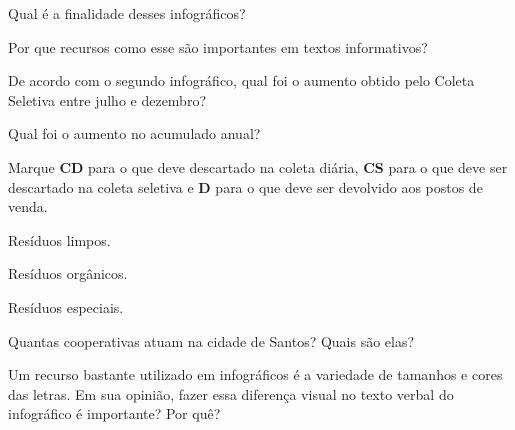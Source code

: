 \begin{escolha}
\item Qual é a finalidade desses infográficos?


\item Por que recursos como esse são importantes em textos informativos?


\item De acordo com o segundo infográfico, qual foi o aumento obtido
pelo Coleta Seletiva entre julho e dezembro?


\item Qual foi o aumento no acumulado anual?

\item Marque \textbf{CD} para o que deve descartado na coleta diária,
\textbf{CS} para o que deve ser descartado na coleta seletiva e \textbf{D}
para o que deve ser devolvido aos postos de venda.

\begin{boxlist}
\boxitem[\rosa{CS}] Resíduos limpos.

\boxitem[\rosa{CD}] Resíduos orgânicos.

\boxitem[\rosa{D}] Resíduos especiais.
\end{boxlist}

\item Quantas cooperativas atuam na cidade de Santos? Quais são elas?


\item Um recurso bastante utilizado em infográficos é a variedade de
tamanhos e cores das letras. Em sua opinião, fazer essa diferença visual
no texto verbal do infográfico é importante? Por quê?

\end{escolha}


